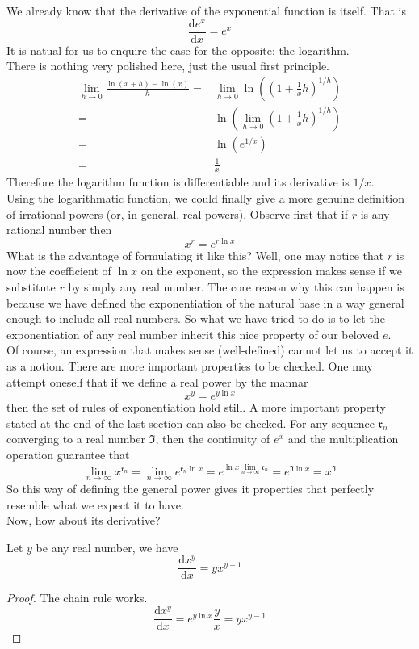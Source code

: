 We already know that the derivative of the exponential function is itself.
That is
$$\frac{\mathrm de^x}{\mathrm dx}=e^x$$
It is natual for us to enquire the case for the opposite: the logarithm.\\
There is nothing very polished here, just the usual first principle.
\begin{align*}
    \lim_{h\to0}\frac{\ln(x+h)-\ln(x)}{h}
    =&\lim_{h\to0}\ln\left(\left(1+\frac{1}{x}h\right)^{1/h}\right)\\
    =&\ln\left(\lim_{h\to0}\left(1+\frac{1}{x}h\right)^{1/h}\right)\\
    =&\ln(e^{1/x})\\
    =&\frac{1}{x}
\end{align*}
Therefore the logarithm function is differentiable and its derivative is $1/x$.\\
Using the logarithmatic function, we could finally give a more genuine definition of irrational powers (or, in general, real powers).
Observe first that if $r$ is any rational number then
$$x^r=e^{r\ln{x}}$$
What is the advantage of formulating it like this?
Well, one may notice that $r$ is now the coefficient of $\ln{x}$ on the exponent, so the expression makes sense if we substitute $r$ by simply any real number.
The core reason why this can happen is because we have defined the exponentiation of the natural base in a way general enough to include all real numbers.
So what we have tried to do is to let the exponentiation of any real number inherit this nice property of our beloved $e$.\\
Of course, an expression that makes sense (well-defined) cannot let us to accept it as a notion.
There are more important properties to be checked.
One may attempt oneself that if we define a real power by the mannar
$$x^y=e^{y\ln{x}}$$
then the set of rules of exponentiation hold still.
A more important property stated at the end of the last section can also be checked.
For any sequence $\mathfrak r_n$ converging to a real number $\mathfrak I$, then the continuity of $e^x$ and the multiplication operation guarantee that
$$\lim_{n\to\infty}x^{\mathfrak r_n}=\lim_{n\to\infty}e^{\mathfrak r_n\ln{x}}=e^{\ln{x}\lim_{n\to\infty}\mathfrak r_n}=e^{\mathfrak I\ln{x}}=x^{\mathfrak I}$$
So this way of defining the general power gives it properties that perfectly resemble what we expect it to have.\\
Now, how about its derivative?
\begin{theorem}
    Let $y$ be any real number, we have
    $$\frac{\mathrm dx^y}{\mathrm dx}=yx^{y-1}$$
\end{theorem}
\begin{proof}
    The chain rule works.
    $$\frac{\mathrm dx^y}{\mathrm dx}=e^{y\ln x}\frac{y}{x}=yx^{y-1}$$
\end{proof}
